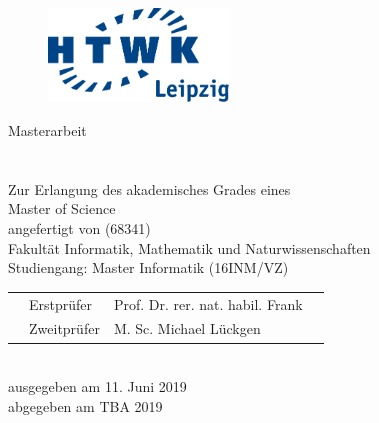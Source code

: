 \makeatletter
\begin{titlepage}
  \vspace{1cm}

  \begin{figure}[h!]
    \centering
    \includegraphics[height=2.5cm]{src/Title/logo_htwk.pdf}
  \end{figure}

  \begin{center}
    \vspace{1cm}

    \begin{onehalfspacing}
      {\Large Masterarbeit} \\[8ex]
      \textbf{
        {\Huge\@title} \\[5ex]
        {\Large\@subtitle} \\[8ex]
      }
      \large
      Zur Erlangung des akademisches Grades eines \\
      Master of Science \\[5ex]
      \vfill
      {\libertineSB angefertigt von \@author{ }(68341)}\\[5ex]
      \vfill
      Fakultät Informatik, Mathematik und Naturwissenschaften\\
      Studiengang: Master Informatik (16INM/VZ)\\[5ex]
      \vfill
      \begin{tabularx}{\textwidth}{Xm{2.5cm}lX}
        & Erstprüfer & Prof. Dr. rer. nat. habil. Frank &\\
        & Zweitprüfer & M. Sc. Michael Lückgen &
      \end{tabularx} \\[5ex]
      \vfill
      ausgegeben am 11. Juni 2019 \\
      abgegeben am TBA 2019
    \end{onehalfspacing}
  \end{center}
\end{titlepage}
\makeatother
